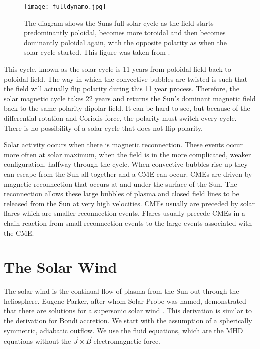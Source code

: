 \documentclass[%
 reprint,
 amsmath,amssymb,
 aps,
]{revtex4-1}
\begin{document}
\begin{center}
\begin{figure}[h] 
\texttt{[image: fulldynamo.jpg]}
\caption{The diagram shows the Suns full solar cycle as the field starts predominantly poloidal, becomes more toroidal and then becomes dominantly poloidal again, with the opposite polarity as when the solar cycle started. This figure was taken from \cite{fulldynamo}. \label{fulldynamo}}
\end{figure}
\end{center}

This cycle, known as the solar cycle is 11 years from poloidal field back to poloidal field. The way in which the convective bubbles are twisted is such that the field will actually flip polarity during this 11 year process. Therefore, the solar magnetic cycle takes 22 years and returns the Sun's dominant magnetic field back to the same polarity dipolar field. It can be hard to see, but because of the differential rotation and Coriolis force, the polarity must switch every cycle. There is no possibility of a solar cycle that does not flip polarity.

Solar activity occurs when there is magnetic reconnection. These events occur more often at solar maximum, when the field is in the more complicated, weaker configuration, halfway through the cycle. When convective bubbles rise up they can escape from the Sun all together and a CME can occur. CMEs are driven by magnetic reconnection that occurs at and under the surface of the Sun. The reconnection allows these large bubbles of plasma and closed field lines to be released from the Sun at very high velocities. CMEs usually are preceded by solar flares which are smaller reconnection events. Flares usually precede CMEs in a chain reaction from small reconnection events to the large events associated with the CME.




\section{The Solar Wind}

The solar wind is the continual flow of plasma from the Sun out through the heliosphere. Eugene Parker, after whom Solar Probe was named, demonstrated that there are solutions for a supersonic solar wind \cite{parker65}. This derivation is similar to the derivation for Bondi accretion. We start with the assumption of a spherically symmetric, adiabatic outflow. We use the fluid equations, which are the MHD equations without the $\vec{J} \times \vec{B}$ electromagnetic force.
\end{document}
